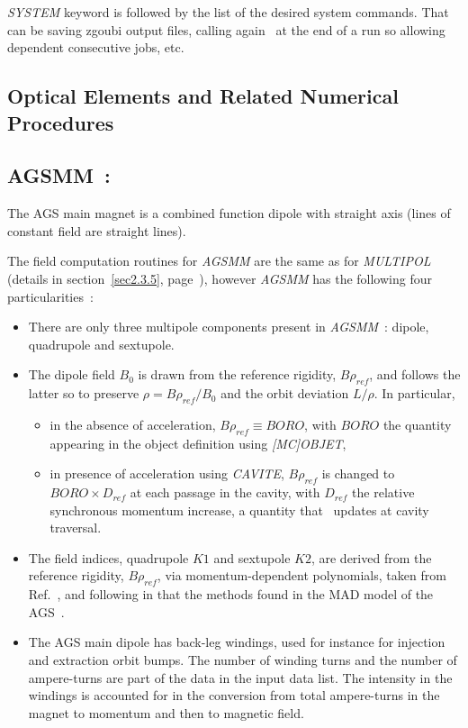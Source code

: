 \medskip 

\noindent  \textsl{SYSTEM} keyword is followed by the list of the desired system commands. That 
can be saving zgoubi output files, calling again \zgou\ at the end of a run so allowing 
dependent consecutive jobs, etc. 




\clearemptydoublepage


\subsection{Optical Elements and Related Numerical Procedures} \label{sec4.4}


\subsection*{AGSMM~:  \AGSMMTitl} \label{AGSMM}
\medskip 


The AGS main magnet is a combined function dipole with straight axis (lines of constant field are straight lines).  

\noindent The field computation routines for   \textsl{AGSMM}  are the same as for \textsl{MULTIPOL} 
(details in section~\ref{sec2.3.5}, page~\pageref{sec2.3.5}), 
however  \textsl{AGSMM}  has  the following four particularities~: 

\begin{itemize}
  \item There are only three multipole components present in \textsl{AGSMM}~: dipole, quadrupole and sextupole. 
  \item The dipole field $B_0$ is drawn from the reference rigidity, $B\rho_{ref}$, and  follows the latter so to preserve 
$\rho = B\rho_{ref} / B_0$  and the orbit deviation  $L/\rho$. In particular, 
  \begin{itemize}
     \item in the absence of acceleration, $B\rho_{ref} \equiv BORO$, with $BORO$ the quantity appearing  in the object definition 
using  \textsl{[MC]OBJET}, 
     \item in presence of acceleration using \textsl{CAVITE}, $B\rho_{ref} $ is changed 
to $ BORO\times D_{ref}$   at each passage in the cavity, with $D_{ref}$ 
the relative synchronous momentum increase, a quantity that \zgou\ updates at cavity traversal.
  \end{itemize}
  \item The field indices, quadrupole $K1$ and sextupole $K2$, are derived from  the reference rigidity, $B\rho_{ref}$, via 
 momentum-dependent polynomials, taken from Ref.~\cite{EJBleser}, 
 and following in that the methods found in the MAD model of the AGS~\cite{MADXAGSModel}. 

  \item The AGS main dipole has back-leg windings, used for instance for injection and extraction orbit bumps. 
The number of winding turns and the  number of ampere-turns 
are part of the data in the input data list. The intensity in the windings is  accounted for in the conversion 
 from total ampere-turns in the magnet  to momentum and then to magnetic field. 
\end{itemize}

